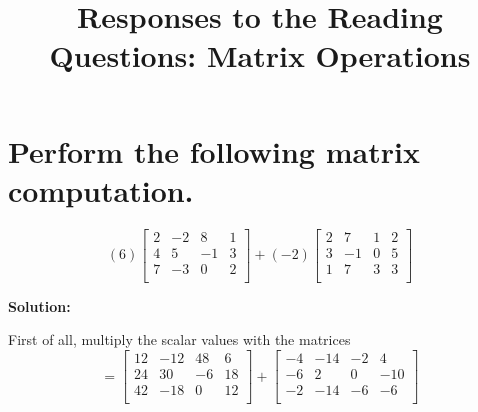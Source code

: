 \documentclass{article}
\title{Responses to the Reading Questions: Matrix Operations}
\begin{document}
\maketitle

\newcommand{\sol} {
  \textbf{Solution:}
}

\newcommand{\LIVHS} {\textbf{Linearly Independent Vectors and Homogeneous Systems}}

\newcommand{\FVCS} {\textbf{Free Variables for Consistent Systems}}

\newcommand{\HSC} {\textbf{Homogeneous Systems are Consistent}}

\newcommand{\ls} {\(\mathcal{LS}(A,\textbf{0})\)}

\newcommand{\p} {$\boxed{1}$~}

\newcommand{\QAA} {
\begin{bmatrix}
  2 & -2 & 8 & 1 \\
  4 & 5 & -1 & 3 \\
  7 & -3 & 0 & 2 \\
\end{bmatrix}
}

\newcommand{\QAB} {
\begin{bmatrix}
  2 & 7 & 1 & 2 \\
  3 & -1 & 0 & 5 \\
  1 & 7 & 3 & 3 \\
\end{bmatrix}
}

\newcommand{\QAC} {
\begin{bmatrix}
  6 & 8 & 4 \\
  -2 & 1 & 0 \\
  9 & -5 & 6 \\
\end{bmatrix}
}

\section{Perform the following matrix computation.}

\[
(6) \QAA + (-2) \QAB
\]

\sol

First of all, multiply the scalar values with the matrices
\begin{equation}
  =
  \begin{bmatrix}
    12 & -12 & 48 & 6 \\
    24 & 30 & -6 & 18 \\
    42 & -18 & 0 & 12 \\
  \end{bmatrix}
  +
  \begin{bmatrix}
    -4 & -14 & -2 & 4 \\
    -6 & 2 & 0 & -10 \\
    -2 & -14 & -6 & -6 \\
  \end{bmatrix}
\end{equation}
\end{document}
